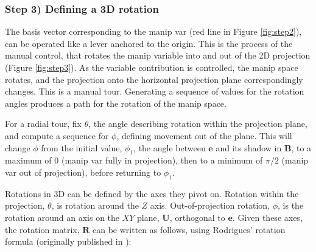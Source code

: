 \hypertarget{step-3-defining-a-3d-rotation}{%
\subsubsection{Step 3) Defining a 3D
rotation}\label{step-3-defining-a-3d-rotation}}

The basis vector corresponding to the manip var (red line in Figure
\ref{fig:step2}), can be operated like a lever anchored to the origin.
This is the process of the manual control, that rotates the manip
variable into and out of the 2D projection (Figure \ref{fig:step3}). As
the variable contribution is controlled, the manip space rotates, and
the projection onto the horizontal projection plane correspondingly
changes. This is a manual tour. Generating a sequence of values for the
rotation angles produces a path for the rotation of the manip space.

For a radial tour, fix \(\theta\), the angle describing rotation within
the projection plane, and compute a sequence for \(\phi\), defining
movement out of the plane. This will change \(\phi\) from the initial
value, \(\phi_1\), the angle between \(\textbf{e}\) and its shadow in
\(\textbf{B}\), to a maximum of \(0\) (manip var fully in projection),
then to a minimum of \(\pi/2\) (manip var out of projection), before
returning to \(\phi_1\).

Rotations in 3D can be defined by the axes they pivot on. Rotation
within the projection, \(\theta\), is rotation around the \(Z\) axis.
Out-of-projection rotation, \(\phi\), is the rotation around an axis on
the \(XY\) plane, \(\textbf{U}\), orthogonal to \(\textbf{e}\). Given
these axes, the rotation matrix, \(\textbf{R}\) can be written as
follows, using Rodrigues' rotation formula (originally published in
\citet{rodrigues_lois_1840}):

